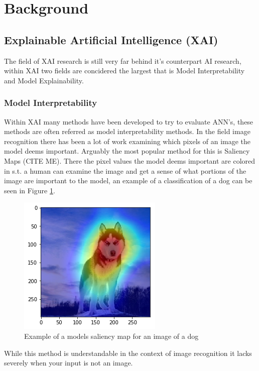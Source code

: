 \section{Background}

\subsection{Explainable Artificial Intelligence (XAI)}

The field of XAI research is still very far behind it's counterpart AI research,
within XAI two fields are concidered the largest that is Model Interpretability
and Model Explainability.

\subsubsection{Model Interpretability}

Within XAI many methods have been developed to try to evaluate
ANN's, these methods are often referred as model interpretability methods.
In the field image recognition there has been a lot of work examining which
pixels of an image the model deems important. Arguably the most popular
method for this is Saliency Maps (CITE ME). There the pixel values the model
deems important are colored in s.t. a human can examine the image and get a
sense of what portions of the image are important to the model, an example of
a classification of a dog can be seen in Figure \ref{fig:dog_saliency}.

\begin{figure}[]
  \centering
  \includegraphics[width=.5\textwidth]{graphics/dog_saliency}
  \caption{Example of a models saliency map for an image of a dog}
  \label{fig:dog_saliency}
\end{figure}

While this method is understandable in the context of image recognition it
lacks severely when your input is not an image.


